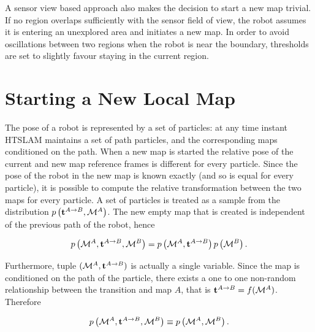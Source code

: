 A sensor view based approach also makes the decision to start a new
map trivial. If no region overlaps sufficiently with the sensor field
of view, the robot assumes it is entering an unexplored area and
initiates a new map. In order to avoid oscillations between two
regions when the robot is near the boundary, thresholds are set to
slightly favour staying in the current region.


\section{Starting a New Local Map}
\label{sec:starting_new_map}


The pose of a robot is represented by a set of particles: at any time
instant HTSLAM maintains a set of path particles, and the
corresponding maps conditioned on the path. When a new map is started
the relative pose of the current and new map reference frames is
different for every particle. Since the pose of the robot in the new
map is known exactly (and so is equal for every particle), it is
possible to compute the relative transformation between the two maps
for every particle. A set of particles is treated as a sample from
the distribution $\prob{\tr{}{A}{B},\mapA}$.  The new empty map that
is created is independent of the previous path of the robot, hence

$$
 \prob{\mapA,\tr{}{A}{B},\mapB} = \prob{\mapA,\tr{}{A}{B}}\prob{\mapB}.
$$

Furthermore, tuple $(\mapA, \tr{}{A}{B})$ is actually a single variable.
Since the map is conditioned on the path of the particle, there exists a
one to one non-random relationship between the transition and map $A$,
that is $\tr{}{A}{B} = f(\mapA)$. Therefore

$$
\prob{\mapA,\tr{}{A}{B},\mapB} \equiv \prob{\mapA,\mapB}.
$$

